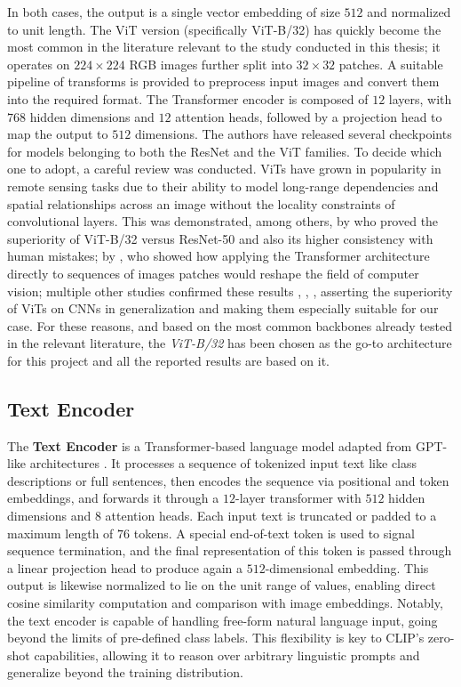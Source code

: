 \documentclass[a4paper, twoside, english]{sapthesis} %
\begin{document}
In both cases, the output is a single vector embedding of size $512$ and normalized to unit length. The ViT version (specifically ViT-B/32) has quickly become the most common in the literature relevant to the study conducted in this thesis; it operates on $224\times224$ RGB images further split into $32\times32$ patches. A suitable pipeline of transforms is provided to preprocess input images and convert them into the required format. The Transformer encoder is composed of $12$ layers, with $768$ hidden dimensions and $12$ attention heads, followed by a projection head to map the output to $512$ dimensions. The authors have released several checkpoints for models belonging to both the ResNet and the ViT families.
To decide which one to adopt, a careful review was conducted. ViTs have grown in popularity in remote sensing tasks due to their ability to model long-range dependencies and spatial relationships across an image without the locality constraints of convolutional layers. This was demonstrated, among others, by \cite{tuli2021convolutional} who proved the superiority of ViT-B/32 versus ResNet-50 and also its higher consistency with human mistakes; by \cite{dosovitskiy2020image}, who showed how applying the Transformer architecture directly to sequences of images patches would reshape the field of computer vision; multiple other studies confirmed these results \cite{deininger2022comparative}, \cite{hutten2022vision}, \cite{liu2024multivariate}, asserting the superiority of ViTs on CNNs in generalization and making them especially suitable for our case. For these reasons, and based on the most common backbones already tested in the relevant literature, the \emph{ViT-B/32} has been chosen as the go-to architecture for this project and all the reported results are based on it.

\subsection{Text Encoder}

The \textbf{Text Encoder} is a Transformer-based \cite{vaswani2017attention} language model adapted from GPT-like architectures \cite{radford2019language}. It processes a sequence of tokenized input text like class descriptions or full sentences, then encodes the sequence via positional and token embeddings, and forwards it through a $12$-layer transformer with $512$ hidden dimensions and $8$ attention heads. Each input text is truncated or padded to a maximum length of $76$ tokens. A special end-of-text token is used to signal sequence termination, and the final representation of this token is passed through a linear projection head to produce again a $512$-dimensional embedding. This output is likewise normalized to lie on the unit range of values, enabling direct cosine similarity computation and comparison with image embeddings.
Notably, the text encoder is capable of handling free-form natural language input, going beyond the limits of pre-defined class labels. This flexibility is key to CLIP’s zero-shot capabilities, allowing it to reason over arbitrary linguistic prompts and generalize beyond the training distribution.
\end{document}

